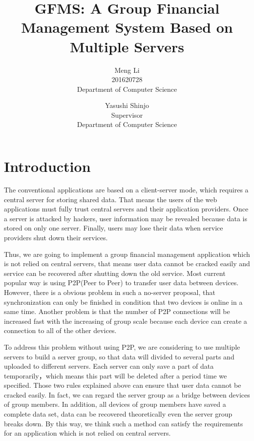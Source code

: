 \documentclass[twocolumn,10pt]{article}
\begin{document}
\date{}

\title{\bf GFMS: A Group Financial Management System Based on Multiple Servers}

\author{
Meng Li\\
201620728\\
Department of Computer Science
\and
Yasushi Shinjo\\
Supervisor\\
Department of Computer Science
}

\maketitle

\section{Introduction}
The conventional applications are based on a client-server mode, which requires a central server for storing shared data. That means the users of the web applications must fully trust central servers and their application providers. Once a server is attacked by hackers, user information may be revealed because data is stored on only one server. Finally, users may lose their data when service providers shut down their services.

Thus, we are going to implement a group financial management application which is not relied on central servers, that means user data cannot be cracked easily and service can be recovered after shutting down the old service. Most current popular way is using P2P(Peer to Peer) to transfer user data between devices. However, there is a obvious problem in such a no-server proposal, that synchronization can only be finished in condition that two devices is online in a same time. Another problem is that the number of P2P connections will be increased fast with the increasing of group scale because each device can create a connection to all of the other devices. 

To address this problem without using P2P, we are considering to use multiple servers to build a server group, so that data will divided to several parts and uploaded to different servers. Each server can only save a part of data temporarily，which means this part will be deleted after a period time we specified. Those two rules explained above can ensure that user data cannot be cracked easily. In fact, we can regard the server group as a bridge between devices of group members. In addition, all devices of group members have saved a complete data set, data can be recovered theoretically even the server group breaks down. By this way, we think such a method can satisfy the requirements for an application which is not relied on central servers.
\end{document}
